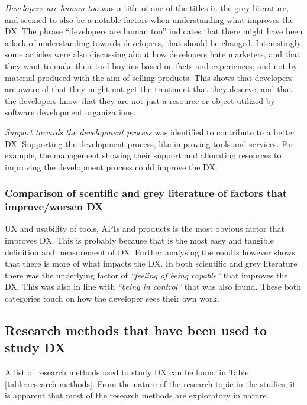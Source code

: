 \documentclass[english, 12pt, a4paper, sci, utf8, a-1b, online]{aaltothesis}
\begin{document}
\textit{Developers are human too} was a title of one of the titles in the grey literature, and seemed to also be a notable factors when understanding what improves the DX. The phrase ``developers are human too'' indicates that there might have been a lack of understanding towards developers, that should be changed. Interestingly some articles were also discussing about how developers hate marketers, and that they want to make their tool buy-ins based on facts and experiences, and not by material produced with the aim of selling products. This shows that developers are aware of that they might not get the treatment that they deserve, and that the developers know that they are not just a resource or object utilized by software development organizations.

\textit{Support towards the development process} was identified to contribute to a better DX. Supporting the development process, like improving tools and services. For example, the management showing their support and allocating resources to improving the development process could improve the DX.

\subsubsection{Comparison of scentific and grey literature of factors that improve/worsen DX}

UX and usability of tools, APIs and products is the most obvious factor that improves DX. This is probably because that is the most easy and tangible definition and measurement of DX. Further analysing the results however shows that there is more of what impacts the DX. In both scientific and grey literature there was the underlying factor of \textit{``feeling of being capable''} that improves the DX. This was also in line with \textit{``being in control''} that was also found. These both categories touch on how the developer sees their own work.

\subsection{Research methods that have been used to study DX}

A list of research methods used to study DX can be found in Table \ref{table:research-methods}. From the nature of the research topic in the studies, it is apparent that most of the research methods are exploratory in nature.
\end{document}
